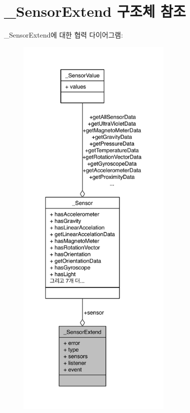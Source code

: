 \hypertarget{struct___sensor_extend}{\section{\-\_\-\-Sensor\-Extend 구조체 참조}
\label{struct___sensor_extend}
}


\-\_\-\-Sensor\-Extend에 대한 협력 다이어그램\-:\nopagebreak
\begin{figure}[H]
\begin{center}
\leavevmode
\includegraphics[height=550pt]{struct___sensor_extend__coll__graph}
\end{center}
\end{figure}
